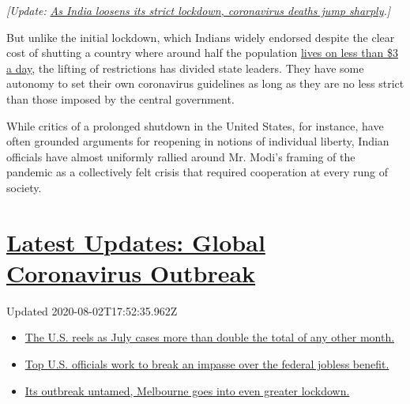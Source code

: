 \emph{{[}Update:}
\href{https://www.nytimes.com/2020/05/06/world/asia/india-coronavirus-lockdown-infections.html}{\emph{As
India loosens its strict lockdown, coronavirus deaths jump
sharply}}\emph{.{]}}

But unlike the initial lockdown, which Indians widely endorsed despite
the clear cost of shutting a country where around half the population
\href{https://databank.worldbank.org/data/download/poverty/33EF03BB-9722-4AE2-ABC7-AA2972D68AFE/Global_POVEQ_IND.pdf}{lives
on less than \$3 a day}, the lifting of restrictions has divided state
leaders. They have some autonomy to set their own coronavirus guidelines
as long as they are no less strict than those imposed by the central
government.

While critics of a prolonged shutdown in the United States, for
instance, have often grounded arguments for reopening in notions of
individual liberty, Indian officials have almost uniformly rallied
around Mr. Modi's framing of the pandemic as a collectively felt crisis
that required cooperation at every rung of society.

\hypertarget{latest-updates-global-coronavirus-outbreak}{%
\section{\texorpdfstring{\href{https://www.nytimes.com/2020/08/01/world/coronavirus-covid-19.html?action=click\&pgtype=Article\&state=default\&region=MAIN_CONTENT_1\&context=storylines_live_updates}{Latest
Updates: Global Coronavirus
Outbreak}}{Latest Updates: Global Coronavirus Outbreak}}\label{latest-updates-global-coronavirus-outbreak}}

Updated 2020-08-02T17:52:35.962Z

\begin{itemize}
\tightlist
\item
  \href{https://www.nytimes.com/2020/08/01/world/coronavirus-covid-19.html?action=click\&pgtype=Article\&state=default\&region=MAIN_CONTENT_1\&context=storylines_live_updates\#link-34047410}{The
  U.S. reels as July cases more than double the total of any other
  month.}
\item
  \href{https://www.nytimes.com/2020/08/01/world/coronavirus-covid-19.html?action=click\&pgtype=Article\&state=default\&region=MAIN_CONTENT_1\&context=storylines_live_updates\#link-780ec966}{Top
  U.S. officials work to break an impasse over the federal jobless
  benefit.}
\item
  \href{https://www.nytimes.com/2020/08/01/world/coronavirus-covid-19.html?action=click\&pgtype=Article\&state=default\&region=MAIN_CONTENT_1\&context=storylines_live_updates\#link-2bc8948}{Its
  outbreak untamed, Melbourne goes into even greater lockdown.}
\end{itemize}

